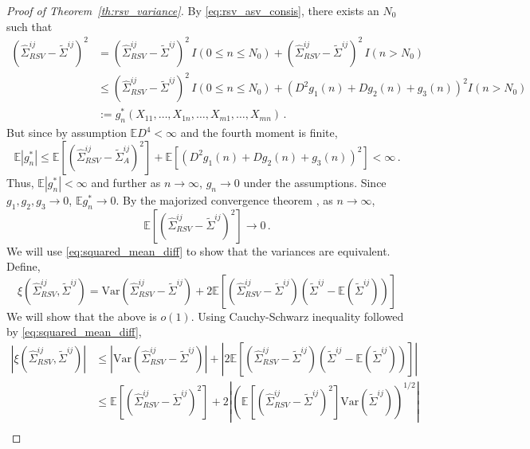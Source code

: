 \documentclass[11pt]{article}
\newcommand{\E}{\mathbb{E}}
\newcommand{\Var}{\text{Var}}
\theoremstyle{remark}
\begin{document}
\begin{proof}[Proof of Theorem~\ref{th:rsv_variance}]
By \eqref{eq:rsv_asv_consis}, there exists an $N_0$ such that
\begin{align*}
\left(\hat{\Sigma}_{RSV}^{ij} - \tilde{\Sigma}^{ij} \right)^2 &= \left(\hat{\Sigma}_{RSV}^{ij} - \tilde{\Sigma}^{ij} \right)^2 \, I(0 \leq n \leq N_0) + \left(\hat{\Sigma}_{RSV}^{ij} - \tilde{\Sigma}^{ij} \right)^2 \, I(n > N_0)\\
& \leq \left(\hat{\Sigma}_{RSV}^{ij} - \tilde{\Sigma}^{ij} \right)^2 \, I(0 \leq n \leq N_0) +  \left(D^2g_1(n) + Dg_2(n) + g_3(n) \right)^2 I(n > N_0)\\
& := g_n^*(X_{11}, \dots, X_{1n}, \dots, X_{m1}, \dots, X_{mn})\,.
\end{align*}
But since by assumption $\E D^4 <\infty$ and the fourth moment is finite,
\[
\E \left| g_n^* \right| \leq  \E \left[\left(\hat{\Sigma}_{RSV}^{ij} - \tilde{\Sigma}_{A}^{ij} \right)^2 \right] + \E \left[\left(D^2g_1(n) + Dg_2(n) + g_3(n) \right)^2 \right] < \infty\,.
\]
Thus, $\E \left| g_n^* \right| < \infty$ and further as $n \to \infty$, $g_n \to 0$ under the assumptions. Since $g_1, g_2, g_3 \to 0$, $\E g_n^* \to 0$. By the majorized convergence theorem \citep{zeid:2013}, as $n \to \infty$,
\begin{equation}
\label{eq:squared_mean_diff}
  \E \left[\left(\hat{\Sigma}_{RSV}^{ij} - \tilde{\Sigma}^{ij} \right)^2 \right] \to 0\,.
\end{equation}
%
We will use \eqref{eq:squared_mean_diff} to show that the variances are equivalent. Define,
\[
\xi\left(\hat{\Sigma}_{RSV}^{ij}, \tilde{\Sigma}^{ij} \right) = \Var\left(\hat{\Sigma}_{RSV}^{ij} - \tilde{\Sigma}^{ij} \right) + 2 \E\left[ \left(\hat{\Sigma}_{RSV}^{ij} -  \tilde{\Sigma}^{ij} \right) \left(\tilde{\Sigma}^{ij}  - \E \left( \tilde{\Sigma}^{ij} \right) \right) \right]
\]
We will show that the above is $o(1)$. Using Cauchy-Schwarz inequality followed by \eqref{eq:squared_mean_diff},
\begin{align*}
\left|  \xi\left(\hat{\Sigma}_{RSV}^{ij}, \tilde{\Sigma}^{ij} \right) \right| & \leq \left| \Var\left(\hat{\Sigma}_{RSV}^{ij} -  \tilde{\Sigma}^{ij} \right) \right| + \left| 2 \E\left[ \left(\hat{\Sigma}_{RSV}^{ij} - \tilde{\Sigma}^{ij} \right) \left(\tilde{\Sigma}^{ij}  - \E \left( \tilde{\Sigma}^{ij} \right) \right) \right]\right| \\ 
& \leq \E\left[\left(\hat{\Sigma}_{RSV}^{ij} -  \tilde{\Sigma}^{ij} \right)^2 \right] + 2 \left| \left(\E\left[ \left(\hat{\Sigma}_{RSV}^{ij} - \tilde{\Sigma}^{ij} \right)^2 \right]  \Var\left(\tilde{\Sigma}^{ij}  \right)   \right)^{1/2}\right| \\ 

\end{align*}
\end{proof}
\end{document}
